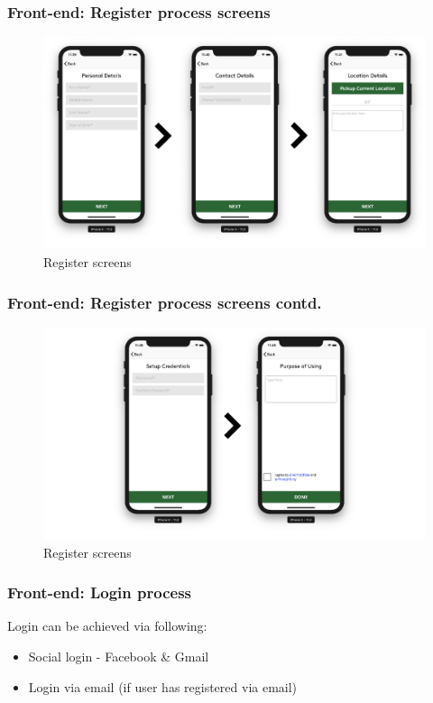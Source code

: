 \begin{frame}
\frametitle{Front-end: Register process screens}
\begin{figure}[H]
            \centering
            \includegraphics[width=0.95\linewidth]{final/figures/register_1.png}
            \caption{Register screens}
    \end{figure}
\end{frame}

\begin{frame}
\frametitle{Front-end: Register process screens contd.}
    \begin{figure}[H]
            \centering
            \includegraphics[width=0.95\linewidth]{final/figures/register_2.png}
            \caption{Register screens}
    \end{figure}
\end{frame}

\begin{frame}
\frametitle{Front-end: Login process}

    Login can be achieved via following:
    
    \begin{itemize}
        \item Social login - Facebook \& Gmail
        \item Login via email (if user has registered via email)
    \end{itemize}
\end{frame}

